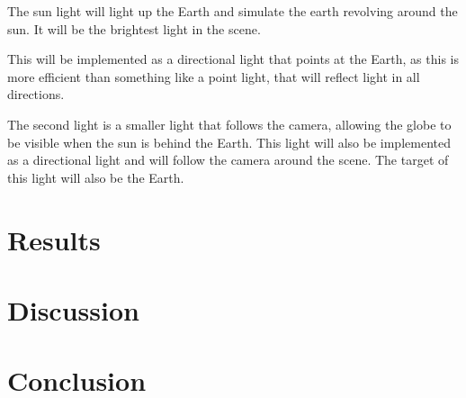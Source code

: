 \documentclass[]{article}
\begin{document}
The sun light will light up the Earth and simulate the earth revolving around the sun.
It will be the brightest light in the scene.

This will be implemented as a directional light that points at the Earth,
as this is more efficient than something like a point light, that will reflect light in all directions.

The second light is a smaller light that follows the camera,
allowing the globe to be visible when the sun is behind the Earth.
This light will also be implemented as a directional light and will follow the camera around the scene.
The target of this light will also be the Earth.

\section{Results}

\section{Discussion}

\section{Conclusion}
\end{document}
